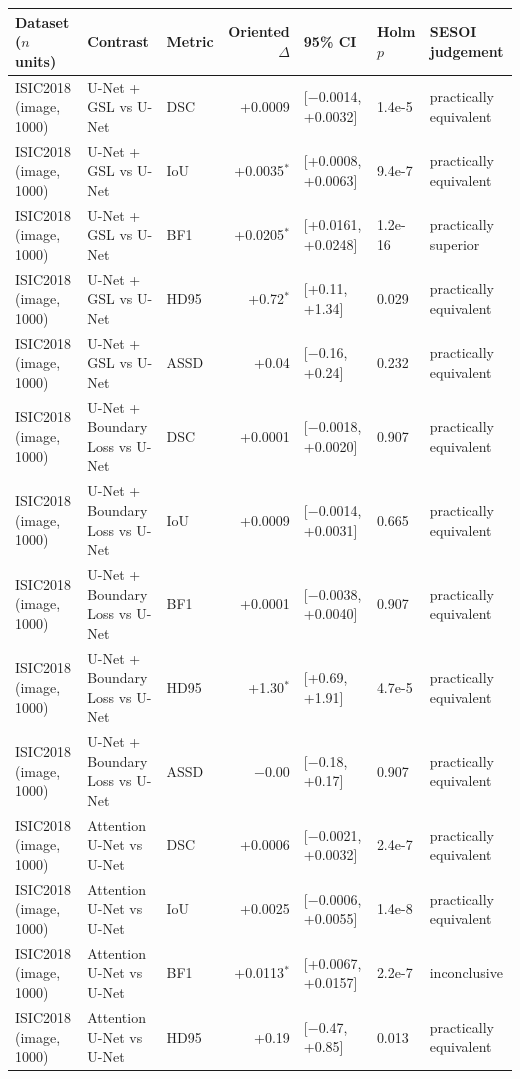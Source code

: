 \begin{tabular}{lllrlll}
\toprule
Dataset ($n$ units) & Contrast & Metric & Oriented $\Delta$ & 95\% CI & Holm $p$ & SESOI judgement \\
\midrule
ISIC2018 (image, 1000) & U-Net + GSL vs U-Net & DSC & +0.0009 & [$-$0.0014, +0.0032] & 1.4e-5 & practically equivalent \\
ISIC2018 (image, 1000) & U-Net + GSL vs U-Net & IoU & +0.0035$^{*}$ & [+0.0008, +0.0063] & 9.4e-7 & practically equivalent \\
ISIC2018 (image, 1000) & U-Net + GSL vs U-Net & BF1 & +0.0205$^{*}$ & [+0.0161, +0.0248] & 1.2e-16 & practically superior \\
ISIC2018 (image, 1000) & U-Net + GSL vs U-Net & HD95 & +0.72$^{*}$ & [+0.11, +1.34] & 0.029 & practically equivalent \\
ISIC2018 (image, 1000) & U-Net + GSL vs U-Net & ASSD & +0.04 & [$-$0.16, +0.24] & 0.232 & practically equivalent \\
ISIC2018 (image, 1000) & U-Net + Boundary Loss vs U-Net & DSC & +0.0001 & [$-$0.0018, +0.0020] & 0.907 & practically equivalent \\
ISIC2018 (image, 1000) & U-Net + Boundary Loss vs U-Net & IoU & +0.0009 & [$-$0.0014, +0.0031] & 0.665 & practically equivalent \\
ISIC2018 (image, 1000) & U-Net + Boundary Loss vs U-Net & BF1 & +0.0001 & [$-$0.0038, +0.0040] & 0.907 & practically equivalent \\
ISIC2018 (image, 1000) & U-Net + Boundary Loss vs U-Net & HD95 & +1.30$^{*}$ & [+0.69, +1.91] & 4.7e-5 & practically equivalent \\
ISIC2018 (image, 1000) & U-Net + Boundary Loss vs U-Net & ASSD & $-$0.00 & [$-$0.18, +0.17] & 0.907 & practically equivalent \\
ISIC2018 (image, 1000) & Attention U-Net vs U-Net & DSC & +0.0006 & [$-$0.0021, +0.0032] & 2.4e-7 & practically equivalent \\
ISIC2018 (image, 1000) & Attention U-Net vs U-Net & IoU & +0.0025 & [$-$0.0006, +0.0055] & 1.4e-8 & practically equivalent \\
ISIC2018 (image, 1000) & Attention U-Net vs U-Net & BF1 & +0.0113$^{*}$ & [+0.0067, +0.0157] & 2.2e-7 & inconclusive \\
ISIC2018 (image, 1000) & Attention U-Net vs U-Net & HD95 & +0.19 & [$-$0.47, +0.85] & 0.013 & practically equivalent \\

\end{tabular}
